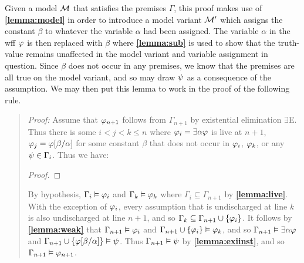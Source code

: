 Given a model $\mathcal{M}$ that satisfies the premises $\Gamma$, this proof makes use of \textbf{\ref{lemma:model}} in order to introduce a model variant $\mathcal{M}'$ which assigns the constant $\beta$ to whatever the variable $\alpha$ had been assigned.
The variable $\alpha$ in the wff $\varphi$ is then replaced with $\beta$ where \textbf{\ref{lemma:sub}} is used to show that the truth-value remains unaffected in the model variant and variable assignment in question.
Since $\beta$ does not occur in any premises, we know that the premises are all true on the model variant, and so may draw $\psi$ as a consequence of the assumption. 
We may then put this lemma to work in the proof of the following rule.





\begin{quote} 
  \textit{Proof:} Assume that $\varphi_{n+1}$ follows from $\Gamma_{n+1}$ by existential elimination $\exists$E.
  Thus there is some $i<j<k\leq n$ where $\varphi_i=\exists \alpha\varphi$ is live at $n+1$, $\varphi_j=\varphi[\beta/\alpha]$ for some constant $\beta$ that does not occur in $\varphi_i$, $\varphi_k$, or any $\psi\in\Gamma_i$.
  Thus we have:

  \begin{proof}
    \open	
       
    \close
     
  \end{proof}

  By hypothesis, $\Gamma_i\vDash\varphi_i$ and $\Gamma_k\vDash\varphi_k$ where $\Gamma_i\subseteq \Gamma_{n+1}$ by \textbf{\ref{lemma:live}}.
  With the exception of $\varphi_i$, every assumption that is undischarged at line $k$ is also undischarged at line $n+1$, and so $\Gamma_k\subseteq\Gamma_{n+1}\cup\lbrace\varphi_i\rbrace$.
  It follows by \textbf{\ref{lemma:weak}} that $\Gamma_{n+1} \vDash \varphi_i$ and $\Gamma_{n+1}\cup\lbrace\varphi_i\rbrace \vDash \varphi_k$, and so $\Gamma_{n+1} \vDash \exists \alpha\varphi$ and $\Gamma_{n+1}\cup\lbrace\varphi[\beta/\alpha]\rbrace \vDash \psi$.
  Thus $\Gamma_{n+1}\vDash\psi$ by \textbf{\ref{lemma:exiinst}}, and so $\Gamma_{n+1}\vDash\varphi_{n+1}$.
\end{quote}


